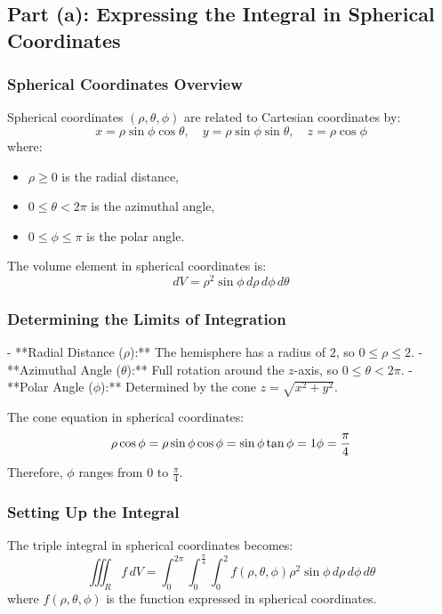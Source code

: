 \documentclass[11pt]{article}
\begin{document}
\newpage

\subsection{Part (a): Expressing the Integral in Spherical Coordinates}

\subsubsection{Spherical Coordinates Overview}
Spherical coordinates \((\rho, \theta, \phi)\) are related to Cartesian coordinates by:
\[
x = \rho \sin\phi \cos\theta, \quad y = \rho \sin\phi \sin\theta, \quad z = \rho \cos\phi
\]
where:
\begin{itemize}
    \item \( \rho \geq 0 \) is the radial distance,
    \item \( 0 \leq \theta < 2\pi \) is the azimuthal angle,
    \item \( 0 \leq \phi \leq \pi \) is the polar angle.
\end{itemize}
The volume element in spherical coordinates is:
\[
dV = \rho^2 \sin\phi \, d\rho \, d\phi \, d\theta
\]

\subsubsection{Determining the Limits of Integration}

- **Radial Distance (\( \rho \)):** The hemisphere has a radius of \( 2 \), so \( 0 \leq \rho \leq 2 \).
- **Azimuthal Angle (\( \theta \)):** Full rotation around the \( z \)-axis, so \( 0 \leq \theta < 2\pi \).
- **Polar Angle (\( \phi \)):** Determined by the cone \( z = \sqrt{x^2 + y^2} \).

  The cone equation in spherical coordinates:
  \[
  \rho \cos\phi = \rho \sin\phi \\
  \cos\phi = \sin\phi \\
  \tan\phi = 1 \\
  \phi = \frac{\pi}{4}
  \]
  Therefore, \( \phi \) ranges from \( 0 \) to \( \frac{\pi}{4} \).

\subsubsection{Setting Up the Integral}

The triple integral in spherical coordinates becomes:
\[
\iiint_{R} f \, dV = \int_{0}^{2\pi} \int_{0}^{\frac{\pi}{4}} \int_{0}^{2} f(\rho, \theta, \phi) \rho^2 \sin\phi \, d\rho \, d\phi \, d\theta
\]
where \( f(\rho, \theta, \phi) \) is the function expressed in spherical coordinates.
\end{document}
